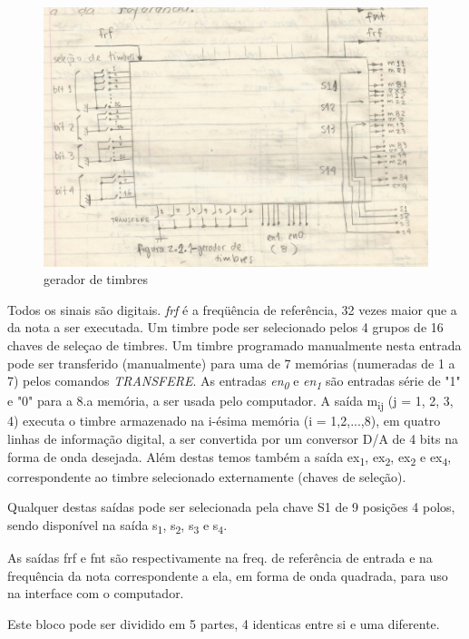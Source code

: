 \documentclass{article}
\begin{document}
\begin{figure}
\centering
\includegraphics[width=12cm]{figuras/2.2.1-gerador de timbres.png}
\caption{gerador de timbres}
\end{figure}

Todos os sinais são digitais. \textit{frf} é a freqüência de referência, 32 vezes maior que a da nota a ser executada. Um timbre pode ser selecionado pelos 4 grupos de 16 chaves de seleçao de timbres. Um timbre programado manualmente nesta entrada pode ser transferido (manualmente) para uma de 7 memórias (numeradas de 1 a 7) pelos comandos \textit{TRANSFERE}. As entradas \textit{en\textsubscript{0}} e \textit{en\textsubscript{1}} são entradas série de "1" e "0" para a 8.a memória, a ser usada pelo computador. A saída m\textsubscript{ij} (j = 1, 2, 3, 4) executa o timbre armazenado na i-ésima memória (i = 1,2,...,8), em quatro linhas de informação digital, a ser convertida por um conversor D/A de 4 bits na forma de onda desejada. Além destas temos também a saída ex\textsubscript{1}, ex\textsubscript{2}, ex\textsubscript{2} e ex\textsubscript{4}, correspondente ao timbre selecionado externamente (chaves de seleção).

Qualquer destas saídas pode ser selecionada pela chave S1 de 9 posições 4 polos, sendo disponível na saída s\textsubscript{1}, s\textsubscript{2}, s\textsubscript{3} e s\textsubscript{4}.

As saídas frf e fnt são respectivamente na freq. de referência de entrada e na frequência da nota correspondente a ela, em forma de onda quadrada, para uso na interface com o computador.

Este bloco pode ser dividido em 5 partes, 4 identicas entre si e uma diferente.
\end{document}
